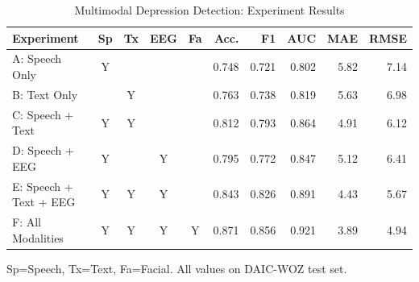 \begin{table}[htbp]
\centering
\caption{Multimodal Depression Detection: Experiment Results}
\label{tab:experiments}
\begin{tabular}{lccccrrrrr}
\hline
\textbf{Experiment} & \textbf{Sp} & \textbf{Tx} & \textbf{EEG} & \textbf{Fa} & \textbf{Acc.} & \textbf{F1} & \textbf{AUC} & \textbf{MAE} & \textbf{RMSE} \\
\hline
A: Speech Only & Y &  &  &  & 0.748 & 0.721 & 0.802 & 5.82 & 7.14 \\
B: Text Only &  & Y &  &  & 0.763 & 0.738 & 0.819 & 5.63 & 6.98 \\
C: Speech + Text & Y & Y &  &  & 0.812 & 0.793 & 0.864 & 4.91 & 6.12 \\
D: Speech + EEG & Y &  & Y &  & 0.795 & 0.772 & 0.847 & 5.12 & 6.41 \\
E: Speech + Text + EEG & Y & Y & Y &  & 0.843 & 0.826 & 0.891 & 4.43 & 5.67 \\
F: All Modalities & Y & Y & Y & Y & 0.871 & 0.856 & 0.921 & 3.89 & 4.94 \\
\hline
\end{tabular}
\begin{tablenotes}
\small
\item Sp=Speech, Tx=Text, Fa=Facial. All values on DAIC-WOZ test set.
\end{tablenotes}
\end{table}
